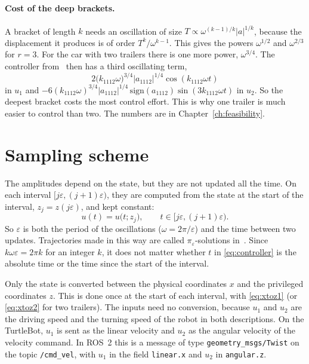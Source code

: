 \paragraph{Cost of the deep brackets.}
A bracket of length $k$ needs an oscillation of size
$T\propto\omega^{(k-1)/k}|a|^{1/k}$, because the displacement it produces is of
order $T^k/\omega^{k-1}$. This gives the powers $\omega^{1/2}$ and $\omega^{2/3}$
for $r=3$. For the car with two trailers there is one more power, $\omega^{3/4}$.
The controller from~\cite{zuyev2024} then has a third oscillating term,
\begin{equation}
  2\bigl(k_{1112}\omega\bigr)^{3/4}|a_{1112}|^{1/4}\cos(k_{1112}\omega t)
\end{equation}
in $u_1$ and $-6(k_{1112}\omega)^{3/4}|a_{1112}|^{1/4}\,\mathrm{sign}(a_{1112})\sin(3k_{1112}\omega t)$
in $u_2$. So the deepest bracket costs the most control effort. This is why one
trailer is much easier to control than two. The numbers are in
Chapter~\ref{ch:feasibility}.

\section{Sampling scheme}
\label{sec:sampling}

The amplitudes depend on the state, but they are not updated all the time. On
each interval $[j\varepsilon,(j+1)\varepsilon)$, they are computed from the state
at the start of the interval, $z_j=z(j\varepsilon)$, and kept constant:
\begin{equation}
  u(t)=u\bigl(t;z_j\bigr),\qquad t\in[j\varepsilon,(j+1)\varepsilon).
\end{equation}
So $\varepsilon$ is both the period of the oscillations
($\omega=2\pi/\varepsilon$) and the time between two updates. Trajectories made
in this way are called $\pi_\varepsilon$-solutions in~\cite{zuyev2024}. Since
$k\omega\varepsilon=2\pi k$ for an integer $k$, it does not matter whether $t$ in
\eqref{eq:controller} is the absolute time or the time since the start of the
interval.

Only the state is converted between the physical coordinates $x$ and the
privileged coordinates $z$. This is done once at the start of each interval, with
\eqref{eq:xtoz1} (or \eqref{eq:xtoz2} for two trailers). The inputs need no
conversion, because $u_1$ and $u_2$ are the driving speed and the turning speed of
the robot in both descriptions. On the TurtleBot, $u_1$ is sent as the linear
velocity and $u_2$ as the angular velocity of the velocity command. In ROS~2 this
is a message of type \texttt{geometry\_msgs/Twist} on the topic
\texttt{/cmd\_vel}, with $u_1$ in the field \texttt{linear.x} and $u_2$ in
\texttt{angular.z}.

